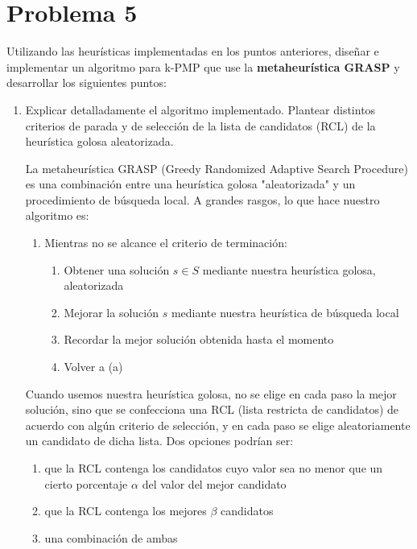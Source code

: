 \documentclass[11pt, a4paper, twoside]{article}
\begin{document}


\newpage
\section{Problema 5}
	Utilizando las heurísticas implementadas en los puntos anteriores, diseñar e implementar un algoritmo para k-PMP que
	use la \textbf{metaheurística GRASP} y desarrollar los siguientes puntos:
	
	 \begin{enumerate}
	 
		\item Explicar detalladamente el algoritmo implementado. Plantear distintos criterios de parada y de selección de la 
			  lista de candidatos (RCL) de la heurística golosa aleatorizada.
			  
			  La metaheurística GRASP (Greedy Randomized Adaptive Search Procedure) es una combinación entre una 
			  heurística golosa "aleatorizada" y un procedimiento de búsqueda local. A grandes rasgos, lo que hace 
			  nuestro algoritmo es:
			  \begin{enumerate}
				\item Mientras no se alcance el criterio de terminación: \\
				      \begin{enumerate}
						\item Obtener una solución $s \in S$ mediante nuestra heurística golosa, aleatorizada
						\item Mejorar la solución $s$ mediante nuestra heurística de búsqueda local
						\item Recordar la mejor solución obtenida hasta el momento
						\item Volver a (a)
				      \end{enumerate}
			  \end{enumerate}
			  
			  Cuando usemos nuestra heurística golosa, no se elige en cada paso
			  la mejor solución, sino que se confecciona una RCL (lista restricta de candidatos) de acuerdo con algún
			  criterio de selección, y en cada paso se elige aleatoriamente un candidato de dicha lista. Dos opciones podrían ser:
			  \begin{enumerate}
				\item que la RCL contenga los candidatos cuyo valor sea no menor que un cierto porcentaje $\alpha$ del valor
					  del mejor candidato
			    \item que la RCL contenga los mejores $\beta$ candidatos
			    \item una combinación de ambas
			  \end{enumerate}
			  

\end{enumerate}
\end{document}
